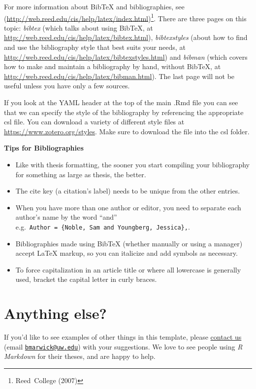 \documentclass [11pt, proquest] {uwthesis}[2015/03/03]
\providecommand{\tightlist}{%
  \setlength{\itemsep}{0pt}\setlength{\parskip}{0pt}}
\begin{document}
For more information about BibTeX and bibliographies, see (\url{http://web.reed.edu/cis/help/latex/index.html})\footnote{Reed~College (2007)}. There are three pages on this topic: \emph{bibtex} (which talks about using BibTeX, at \url{http://web.reed.edu/cis/help/latex/bibtex.html}), \emph{bibtexstyles} (about how to find and use the bibliography style that best suits your needs, at \url{http://web.reed.edu/cis/help/latex/bibtexstyles.html}) and \emph{bibman} (which covers how to make and maintain a bibliography by hand, without BibTeX, at \url{http://web.reed.edu/cis/help/latex/bibman.html}). The last page will not be useful unless you have only a few sources.

If you look at the YAML header at the top of the main .Rmd file you can see that we can specify the style of the bibliography by referencing the appropriate csl file. You can download a variety of different style files at \url{https://www.zotero.org/styles}. Make sure to download the file into the csl folder.

\textbf{Tips for Bibliographies}
\begin{itemize}
\tightlist
\item
  Like with thesis formatting, the sooner you start compiling your bibliography for something as large as thesis, the better.
\item
  The cite key (a citation's label) needs to be unique from the other entries.
\item
  When you have more than one author or editor, you need to separate each author's name by the word ``and'' e.g.~\texttt{Author\ =\ \{Noble,\ Sam\ and\ Youngberg,\ Jessica\},}.
\item
  Bibliographies made using BibTeX (whether manually or using a manager) accept LaTeX markup, so you can italicize and add symbols as necessary.
\item
  To force capitalization in an article title or where all lowercase is generally used, bracket the capital letter in curly braces.
\end{itemize}
\hypertarget{anything-else}{%
\section{Anything else?}\label{anything-else}}

If you'd like to see examples of other things in this template, please \href{https://github.com/benmarwick/huskydown/issues/new}{contact us} (email \href{mailto:bmarwick@uw.edu}{\nolinkurl{bmarwick@uw.edu}}) with your suggestions. We love to see people using \emph{R Markdown} for their theses, and are happy to help.
\end{document}

